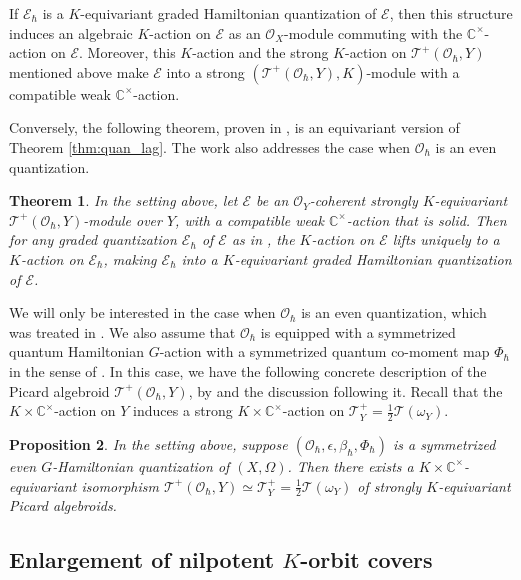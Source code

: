 \documentclass[11pt, a4paper]{amsart}
\newcommand{\C}{\mathbb{C}}
\newcommand{\cE}{\mathcal{E}}
\newcommand{\hb}{\hbar}
\newcommand{\TT}{\mathscr{T}}
\newcommand{\tatp}{\TT^+(\Q, Y)}
\newcommand{\cm}{\C^\times}
\newcommand{\OO}{\mathcal{O}}
\newcommand{\Q}{\OO_\hb}
\newtheorem{Thm}{Theorem}[subsection]
\newtheorem{Prop}[Thm]{Proposition}
\theoremstyle{definition}
\numberwithin{equation}{section}
\begin{document}
If $\cE_\hb$ is a $K$-equivariant graded Hamiltonian quantization of $\cE$, then this structure induces an algebraic $K$-action on $\cE$ as an $\OO_X$-module commuting with the $\cm$-action on $\cE$. Moreover, this $K$-action and the strong $K$-action on $\tatp$ mentioned above make $\cE$ into a strong $(\tatp, K)$-module with a compatible weak $\cm$-action.

Conversely, the following theorem, proven in \cite[Theorem 6.14]{Yu:period}, is an equivariant version of Theorem \ref{thm:quan_lag}. The work \cite[Theorem 6.2.5]{LY} also addresses the case when $\OO_\hb$ is an even quantization.

\begin{Thm}\label{thm:quan_lag_equiv}
	In the setting above, let $\cE$ be an $\OO_Y$-coherent strongly $K$-equivariant $\tatp$-module over $Y$, with a compatible weak $\cm$-action that is solid. Then for any graded quantization $\cE_\hb$ of $\cE$ as in , the $K$-action on $\cE$ lifts uniquely to a $K$-action on $\cE_\hb$, making $\cE_\hb$ into a $K$-equivariant graded Hamiltonian quantization of $\cE$. 
\end{Thm}



We will only be interested in the case when $\OO_\hb$ is an even quantization, which was treated in \cite[Theorem 6.2.5]{LY}. We also assume that $\OO_\hb$ is equipped with a symmetrized quantum Hamiltonian $G$-action with a symmetrized quantum co-moment map $\Phi_\hb$ in the sense of .
In this case, we have the following concrete description of the Picard algebroid $\tatp$, by \cite[Lemma 6.2.4]{LY} and the discussion following it. Recall that the $K \times \cm$-action on $Y$ induces a strong $K \times \cm$-action on $\TT^+_Y = \frac{1}{2}\TT(\omega_Y)$.

\begin{Prop} \label{prop:tatp_symm}
	In the setting above, suppose $(\OO_\hb,\epsilon,\beta_\hb,\Phi_\hb)$ is a symmetrized even $G$-Hamiltonian quantization of $(X, \Omega)$. Then there exists a $K \times \cm$-equivariant isomorphism $\tatp \simeq \TT^+_Y = \frac{1}{2}\TT(\omega_Y)$ of strongly $K$-equivariant Picard algebroids. 
\end{Prop}



\subsection{Enlargement of nilpotent \texorpdfstring{$K$}{K}-orbit covers} \label{subsec:enlarge_lag}
\end{document}
